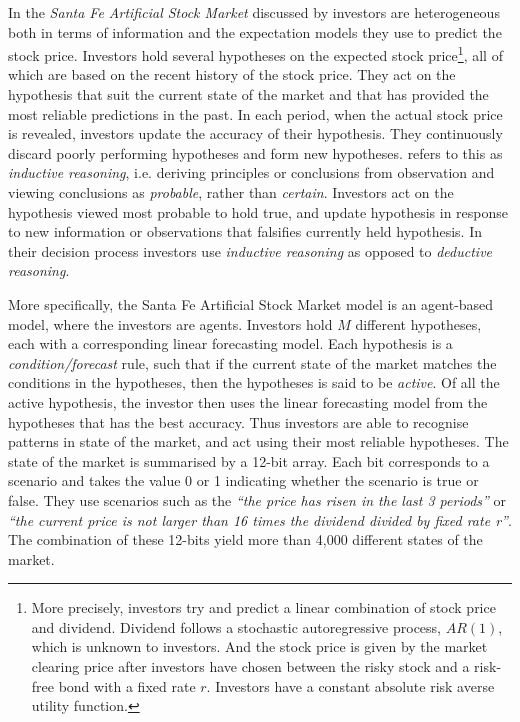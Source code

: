 \documentclass[preprint, 12pt]{elsarticle}
\begin{document}
In the \emph{Santa Fe Artificial Stock Market} discussed by \citet[chapter~3, chapter~11]{Arthur_2014} investors are heterogeneous both in terms of information and the expectation models they use to predict the stock price. Investors hold several hypotheses on the expected stock price\footnote{More precisely, investors try and predict a linear combination of stock price and dividend. Dividend follows a stochastic autoregressive process, $AR(1)$, which is unknown to investors. And the stock price is given by the market clearing price after investors have chosen between the risky stock and a risk-free bond with a fixed rate $r$. Investors have a constant absolute risk averse utility function.}, all of which are based on the recent history of the stock price. They act on the hypothesis that suit the current state of the market and that has provided the most reliable predictions in the past. In each period, when the actual stock price is revealed, investors update the accuracy of their hypothesis. They continuously discard poorly performing hypotheses and form new hypotheses. \citet{Arthur_2014} refers to this as \emph{inductive reasoning}, i.e. deriving principles or conclusions from observation and viewing conclusions as \emph{probable}, rather than \emph{certain}. Investors act on the hypothesis viewed most probable to hold true, and update hypothesis in response to new information or observations that falsifies currently held hypothesis. In their decision process investors use \emph{inductive reasoning} as opposed to \emph{deductive reasoning}.

More specifically, the Santa Fe Artificial Stock Market model is an agent-based model, where the investors are agents. Investors hold $M$ different hypotheses, each with a corresponding linear forecasting model. Each hypothesis is a \emph{condition/forecast} rule, such that if the current state of the market matches the conditions in the hypotheses, then the hypotheses is said to be \emph{active}. Of all the active hypothesis, the investor then uses the linear forecasting model from the hypotheses that has the best accuracy. Thus investors are able to recognise patterns in state of the market, and act using their most reliable hypotheses. The state of the market is summarised by a 12-bit array. Each bit corresponds to a scenario and takes the value 0 or 1 indicating whether the scenario is true or false. They use scenarios such as the \emph{``the price has risen in the last 3 periods''} or \emph{``the current price is not larger than 16 times the dividend divided by fixed rate r''}. The combination of these 12-bits yield more than 4,000 different states of the market. 
\end{document}

